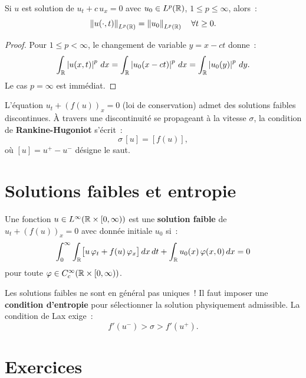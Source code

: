 \begin{proposition}
Si $u$ est solution de $u_t + c\, u_x = 0$ avec $u_0 \in L^p(\mathbb{R})$,
$1 \leq p \leq \infty$, alors~:
\[
    \left\| u(\cdot, t) \right\|_{L^p(\mathbb{R})} = \left\| u_0 \right\|_{L^p(\mathbb{R})}
    \quad \forall t \geq 0.
\]
\end{proposition}

\begin{proof}
Pour $1 \leq p < \infty$, le changement de variable $y = x - ct$ donne~:
\[
    \int_{\mathbb{R}} \left| u(x,t) \right|^p\, dx
    = \int_{\mathbb{R}} \left| u_0(x-ct) \right|^p\, dx
    = \int_{\mathbb{R}} \left| u_0(y) \right|^p\, dy.
\]
Le cas $p = \infty$ est imm\'ediat.
\end{proof}

\begin{theoreme}
L'\'equation $u_t + (f(u))_x = 0$ (loi de conservation) admet des solutions
faibles discontinues. \`A travers une discontinuit\'e se propageant \`a la
vitesse $\sigma$, la condition de \textbf{Rankine-Hugoniot} s'\'ecrit~:
\begin{equation}\label{eq:rankine_hugoniot}
    \sigma\, [u] = [f(u)],
\end{equation}
o\`u $[u] = u^+ - u^-$ d\'esigne le saut.
\end{theoreme}

\section{Solutions faibles et entropie}

\begin{definition}
Une fonction $u \in L^\infty(\mathbb{R} \times [0,\infty))$ est une \textbf{solution
faible} de $u_t + (f(u))_x = 0$ avec donn\'ee initiale $u_0$ si~:
\[
    \int_0^\infty \int_{\mathbb{R}} \bigl[u\, \varphi_t + f(u)\, \varphi_x\bigr]\, dx\, dt
    + \int_{\mathbb{R}} u_0(x)\, \varphi(x,0)\, dx = 0
\]
pour toute $\varphi \in C_c^\infty(\mathbb{R} \times [0,\infty))$.
\end{definition}

\begin{attention}[title=\textbf{Non-unicit\'e des solutions faibles}]
Les solutions faibles ne sont en g\'en\'eral pas uniques~! Il faut
imposer une \textbf{condition d'entropie} pour s\'electionner la solution
physiquement admissible. La condition de Lax exige~:
\[
    f'(u^-) > \sigma > f'(u^+).
\]
\end{attention}

\section{Exercices}

